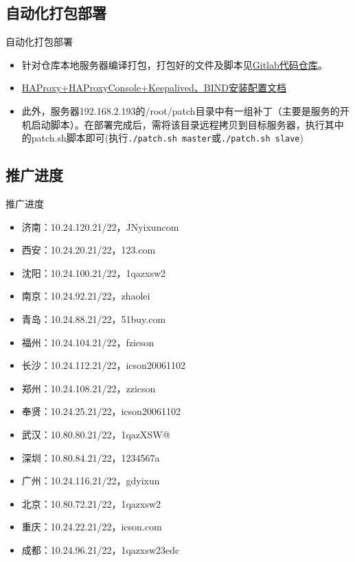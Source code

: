\documentclass[CJK]{beamer}
\begin{document}
\begin{CJK*}{UTF8}{gbsn}
\subsection{自动化打包部署}
\begin{frame}[containsverbatim]{自动化打包部署}
\begin{itemize}
\item 针对仓库本地服务器编译打包，打包好的文件及脚本见\href{http://10.24.178.60:8000/yongfengxia/deploy_packages}{Gitlab代码仓库}。
\item \href{run:HAProxy_HAProxyConsole_Keepalived_BIND_Installation.pdf}{HAProxy+HAProxyConsole+Keepalived、BIND安装配置文档}
\item 此外，服务器192.168.2.193的/root/patch目录中有一组补丁（主要是服务的开机启动脚本）。在部署完成后，需将该目录远程拷贝到目标服务器，执行其中的patch.sh脚本即可(执行\verb"./patch.sh master"或\verb"./patch.sh slave")
\end{itemize}
\end{frame}

\subsection{推广进度}
\begin{frame}{推广进度}
\begin{itemize}
\item 济南：10.24.120.21/22，JNyixuncom
\item 西安：10.24.20.21/22，123.com
\item 沈阳：10.24.100.21/22，1qazxsw2
\item 南京：10.24.92.21/22，zhaolei
\item 青岛：10.24.88.21/22，51buy.com
\item 福州：10.24.104.21/22，fzicson
\item 长沙：10.24.112.21/22，icson20061102
\item 郑州：10.24.108.21/22，zzicson
\item 奉贤：10.24.25.21/22，icson20061102
\item 武汉：10.80.80.21/22，1qazXSW@
\item 深圳：10.80.84.21/22，1234567a
\item 广州：10.24.116.21/22，gdyixun
\item 北京：10.80.72.21/22，1qazxsw2
\item 重庆：10.24.22.21/22，icson.com
\item 成都：10.24.96.21/22，1qazxsw23edc
\end{itemize}
\end{frame}


\end{CJK*}
\end{document}
